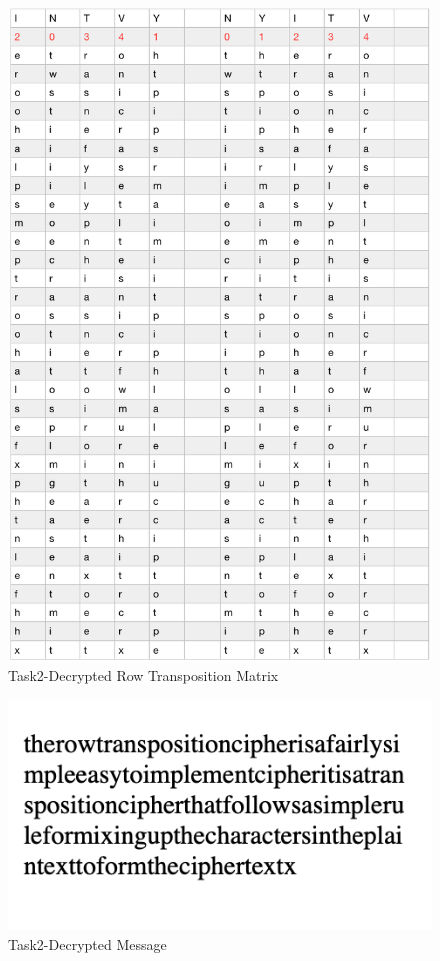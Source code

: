 \documentclass[twoside,twocolumn]{article}
\begin{document}
\begin{figure}[H]
  \centering
  \includegraphics[scale=0.55]{./Graphs/Figure1.8.png}
  \caption{Task2-Decrypted Row Transposition Matrix \\}
  \label{fig:testfig1}
\end{figure}


\begin{figure}[H]
  \centering
  \includegraphics[scale=0.75]{./Graphs/Figure1.9.png}
  \caption{Task2-Decrypted Message}
  \label{fig:testfig1}
\end{figure}
\end{document}
